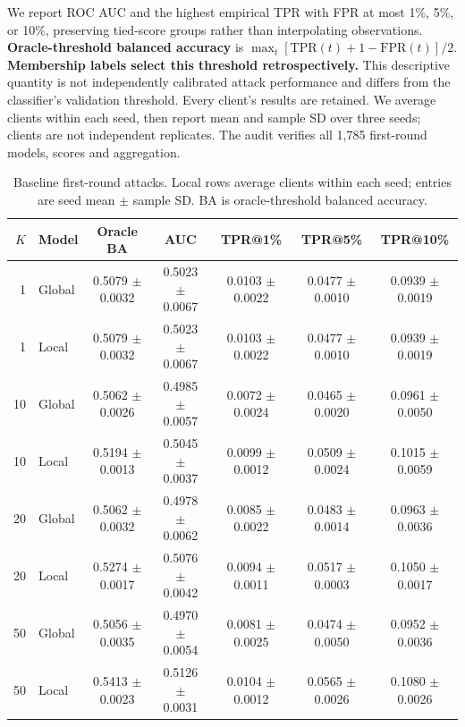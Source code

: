 \documentclass[10pt]{article}
\begin{document}
We report ROC AUC and the highest empirical TPR with FPR at most 1\%, 5\%, or
10\%, preserving tied-score groups rather than interpolating observations.
\textbf{Oracle-threshold balanced accuracy} is
$\max_t[\mathrm{TPR}(t)+1-\mathrm{FPR}(t)]/2$.
\textbf{Membership labels select this threshold retrospectively.} This descriptive quantity is not independently
calibrated attack performance and differs from the classifier's validation
threshold. Every client's results are retained. We average clients within each seed, then
report mean and sample SD over three seeds; clients are not independent replicates.
The audit verifies all 1,785 first-round models, scores and aggregation.

\begin{table}[ht]\centering\scriptsize
\caption{Baseline first-round attacks. Local rows average clients within each
seed; entries are seed mean $\pm$ sample SD. BA is oracle-threshold balanced accuracy.}
\begin{tabular}{rlccccc}\toprule
$K$ & Model & Oracle BA & AUC & TPR@1\% & TPR@5\% & TPR@10\% \\
\midrule
1 & Global & 0.5079 $\pm$ 0.0032 & 0.5023 $\pm$ 0.0067 & 0.0103 $\pm$ 0.0022 & 0.0477 $\pm$ 0.0010 & 0.0939 $\pm$ 0.0019 \\
1 & Local & 0.5079 $\pm$ 0.0032 & 0.5023 $\pm$ 0.0067 & 0.0103 $\pm$ 0.0022 & 0.0477 $\pm$ 0.0010 & 0.0939 $\pm$ 0.0019 \\
10 & Global & 0.5062 $\pm$ 0.0026 & 0.4985 $\pm$ 0.0057 & 0.0072 $\pm$ 0.0024 & 0.0465 $\pm$ 0.0020 & 0.0961 $\pm$ 0.0050 \\
10 & Local & 0.5194 $\pm$ 0.0013 & 0.5045 $\pm$ 0.0037 & 0.0099 $\pm$ 0.0012 & 0.0509 $\pm$ 0.0024 & 0.1015 $\pm$ 0.0059 \\
20 & Global & 0.5062 $\pm$ 0.0032 & 0.4978 $\pm$ 0.0062 & 0.0085 $\pm$ 0.0022 & 0.0483 $\pm$ 0.0014 & 0.0963 $\pm$ 0.0036 \\
20 & Local & 0.5274 $\pm$ 0.0017 & 0.5076 $\pm$ 0.0042 & 0.0094 $\pm$ 0.0011 & 0.0517 $\pm$ 0.0003 & 0.1050 $\pm$ 0.0017 \\
50 & Global & 0.5056 $\pm$ 0.0035 & 0.4970 $\pm$ 0.0054 & 0.0081 $\pm$ 0.0025 & 0.0474 $\pm$ 0.0050 & 0.0952 $\pm$ 0.0036 \\
50 & Local & 0.5413 $\pm$ 0.0023 & 0.5126 $\pm$ 0.0031 & 0.0104 $\pm$ 0.0012 & 0.0565 $\pm$ 0.0026 & 0.1080 $\pm$ 0.0026 \\
\bottomrule\end{tabular}\end{table}
\end{document}
